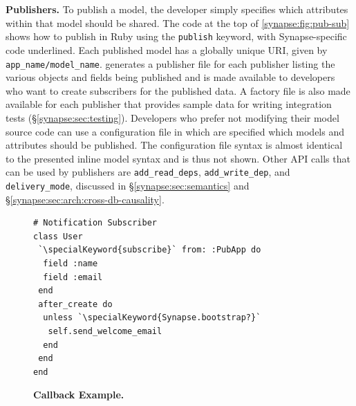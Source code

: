 {\bf Publishers.} 
To publish a model, the developer simply specifies which attributes within that
model should be shared.
The code at the top of
\F\ref{synapse:fig:pub-sub} shows how to publish
in Ruby using the {\tt publish} keyword, with Synapse-specific code
underlined.  
Each published model has a globally unique URI, given by {\tt
app\_name/model\_name}.  \synapse generates a publisher file for each
publisher listing the various objects and fields being published and is made
available to developers who want to create subscribers for the published data.
A factory file is also made available for each publisher that provides sample
data for writing integration tests (\S\ref{synapse:sec:testing}). 
Developers who prefer not modifying their model source code can use a \synapse
configuration file in which are specified which models and attributes should be
published. The configuration file syntax is almost identical to the presented inline
model syntax and is thus not shown.
Other API calls that
can be used by publishers are {\tt add\_read\_deps}, {\tt add\_write\_dep},
and {\tt delivery\_mode}, discussed in
\S\ref{synapse:sec:semantics} and \S\ref{synapse:sec:arch:cross-db-causality}.

\begin{figure}
\centering
\begin{minipage}{.4\textwidth}
  \begin{rbox}
\begin{lstlisting}
# Notification Subscriber
class User
 `\specialKeyword{subscribe}` from: :PubApp do
  field :name
  field :email
 end
 after_create do
  unless `\specialKeyword{Synapse.bootstrap?}`
   self.send_welcome_email
  end
 end
end
\end{lstlisting}
  \end{rbox}
\end{minipage}
\caption{{\bf Callback Example.}}
\label{synapse:fig:welcome-email}
\end{figure}

